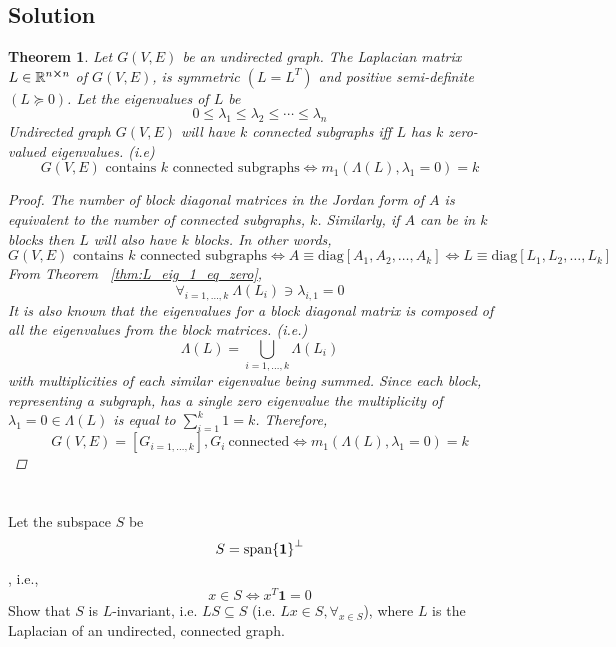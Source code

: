 \documentclass[]{article}
\numberwithin{equation}{section}
\newcommand{\R}{\mathbb{R}}
\newtheorem{theorem}{Theorem}
\begin{document}
\subsection{Solution}
\begin{theorem}
	Let $G(V,E)$ be an undirected graph.
	The Laplacian matrix $L\in\R^{n \cross n}$ of $G(V,E)$, is symmetric $(L=L^T)$ and positive semi-definite $(L\succeq 0)$.
	Let the eigenvalues of $L$ be\[
		0 \leq \lambda_1 \leq \lambda_2 \leq \cdots \leq \lambda_n
	\]
	Undirected graph $G(V,E)$ will have $k$ connected subgraphs iff $L$ has $k$ zero-valued eigenvalues.
	(i.e) \[
		G(V,E) \text{ contains $k$ connected subgraphs}  
		\iff m_1(\Lambda(L), \lambda_1 = 0) = k
	\]
	\begin{proof}
		The number of block diagonal matrices in the Jordan form of $A$ is equivalent to the number of connected subgraphs, $k$.
		Similarly, if $A$ can be in $k$ blocks then $L$ will also have $k$ blocks.
		In other words,\[
			G(V,E) \text{ contains $k$ connected subgraphs}  
			\iff A \equiv \text{diag}[A_1, A_2, \dots, A_k]
			\iff L \equiv \text{diag}[L_1, L_2, \dots, L_k]
		\] From Theorem \ \ref{thm:L_eig_1_eq_zero}, \[
			\forall_{i=1,\dots,k} \ \Lambda(L_{i}) \ni \lambda_{i,1} = 0
		\] It is also known that the eigenvalues for a block diagonal matrix is composed of all the eigenvalues from the block matrices. 
		(i.e.) \[
			\Lambda(L) = \bigcup_{i=1,\dots,k} \Lambda(L_{i})
		\] with  multiplicities of each similar eigenvalue being summed.
		Since each block, representing a subgraph, has a single zero eigenvalue the multiplicity of $\lambda_1 = 0 \in \Lambda(L)$ is equal to $\sum_{i=1}^{k} 1 = k$. 
		Therefore, \[
			G(V,E) = [G_{i=1,\dots,k}], G_{i} \ \text{connected} 
			\iff m_1(\Lambda(L), \lambda_1 = 0) = k
		\]
	\end{proof}
\end{theorem}

\newpage
\section{}
Let the subspace $S$ be\[
	S = \text{span}\qty{\mathbf{1}}^{\perp}
\], i.e.,\[
	x \in S \iff x^T \mathbf{1} = 0
\]
Show that $S$ is $L$-invariant, i.e. $LS \subseteq S$ (i.e. $L x \in S, \forall_{x\in S}$), where $L$ is the Laplacian of an undirected, connected graph.
\end{document}
